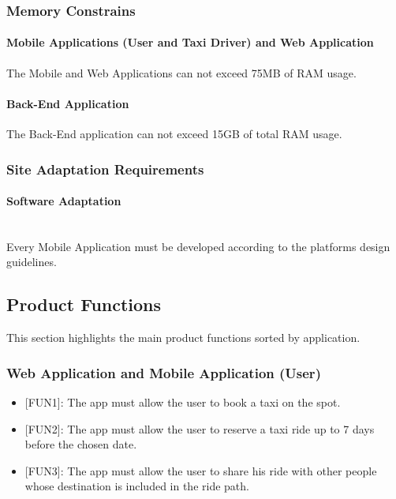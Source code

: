 \documentclass[12pt, a4paper]{article}
\begin{document}
\subsubsection{Memory Constrains} %

\label{ssub:memory_constrains}
\paragraph{Mobile Applications (User and Taxi Driver) and Web Application}
The Mobile and Web Applications can not exceed 75MB of RAM usage.
\paragraph{Back-End Application}
The Back-End application can not exceed 15GB of total RAM usage.

\subsubsection{Site Adaptation Requirements} %
\label{ssub:site_adaptation_requirements}
\paragraph{Software Adaptation} \mbox{} \\
Every Mobile Application must be developed according to the platforms design guidelines.

\subsection{Product Functions} %
\label{sub:product_functions}
This section highlights the main product functions sorted by application.

\subsubsection{Web Application and Mobile Application (User)}
\label{ssub:web_application_and_mobile_application_}
\begin{itemize}
	\item {[FUN1\label{itm:FUN1}]}: The app must allow the user to book a taxi on the spot.
	\item {[FUN2\label{itm:FUN2}]}: The app must allow the user to reserve a taxi ride up to 7 days before the chosen date.
	\item {[FUN3\label{itm:FUN3}]}: The app must allow the user to share his ride with other people whose destination is included in the ride path.
\end{itemize}
\end{document}
